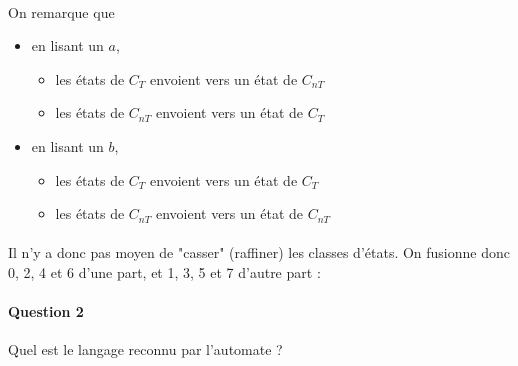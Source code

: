 \documentclass{article}[11pt]
\theoremstyle{definition}
\begin{document}
\paragraph{}On remarque que 

\begin{itemize}
    \item en lisant un $a$,
    \begin{itemize}
        \item les états de $C_T$ envoient vers un état de $C_{nT}$
        \item les états de $C_{nT}$ envoient vers un état de $C_T$
    \end{itemize}
    \item en lisant un $b$,
    \begin{itemize}
        \item les états de $C_T$ envoient vers un état de $C_{T}$
        \item les états de $C_{nT}$ envoient vers un état de $C_{nT}$
    \end{itemize}
\end{itemize}

\paragraph{}Il n'y a donc pas moyen de "casser" (raffiner) les classes d'états. On fusionne donc 0, 2, 4 et 6 d'une part, et 1, 3, 5 et 7 d'autre part : 



\begin{figure}[H]
\centering

\end{figure}

\paragraph{Question 2} Quel est le langage reconnu par l'automate ?
\end{document}
